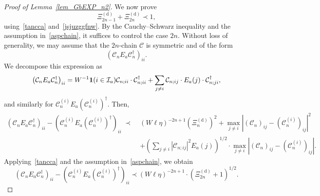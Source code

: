 \documentclass[10pt,reqno]{article}
\theoremstyle{plain} %
\theoremstyle{remark}
\numberwithin{equation}{section}
\begin{document}
\begin{proof}[Proof of Lemma~\ref{lem_GbEXP_n2}]
We now  prove
\begin{equation}\label{juwiuo2pl}
    \Xi^{(\mathrm{d})}_{2n-1} + \Xi^{(\mathrm{d})}_{2n} \prec 1,
\end{equation}
using~\eqref{tancca} and~\eqref{jsjuzggfnw}. By the Cauchy–Schwarz inequality and the assumption in~\eqref{aspchain}, it suffices to control the case \( 2n \). Without loss of generality, we may assume that the $2n$-chain \( \mathcal{C} \) is symmetric and of the form
\[
\left( \mathcal{C}_n E_a \mathcal{C}_n^\dagger \right)_{ii}.
\]
We decompose this expression as
\[
\left( \mathcal{C}_n E_a \mathcal{C}_n^\dagger \right)_{ii}
= W^{-1}{\bf 1}(i\in{\cal I}_a)\mathcal{C}_{n; ii} \cdot \mathcal{C}^\dagger_{n; ii}
+ \sum_{j \ne i} \mathcal{C}_{n; ij} \cdot E_a(j) \cdot \mathcal{C}^\dagger_{n; ji},
\]
and similarly for \( \mathcal{C}_n^{(i)} E_a \left(\mathcal{C}_n^{(i)}\right)^\dagger \). Then,
\begin{align*}
\left( \mathcal{C}_n E_a \mathcal{C}_n^\dagger \right)_{ii}
- \left( \mathcal{C}_n^{(i)} E_a \left( \mathcal{C}_n^{(i)} \right)^\dagger \right)_{ii}
\;\prec\;& (W \ell \eta)^{-2n + 1} \left( \Xi_n^{(\mathrm{d})} \right)^2
+ \max_{j \ne i} \left| \left( \mathcal{C}_n \right)_{ij} - \left( \mathcal{C}_n^{(i)} \right)_{ij} \right|^2\\
&+ \left( \sum_{j \ne i} \left| \mathcal{C}_{n; ij} \right|^2 E_a(j) \right)^{1/2} \cdot \max_{j \ne i} \left| \left( \mathcal{C}_n \right)_{ij} - \left( \mathcal{C}_n^{(i)} \right)_{ij} \right|.
\end{align*}
Applying~\eqref{tancca} and the assumption in~\eqref{aspchain}, we obtain
\begin{equation}\label{j,mssl}
\left( \mathcal{C}_n E_a \mathcal{C}_n^\dagger \right)_{ii}
- \left( \mathcal{C}_n^{(i)} E_a \left( \mathcal{C}_n^{(i)} \right)^\dagger \right)_{ii}
\prec (W \ell \eta)^{-2n + 1} \cdot \left( \Xi_{2n}^{(\mathrm{d})} + 1 \right)^{1/2}.
\end{equation}


\end{proof}
\end{document}
